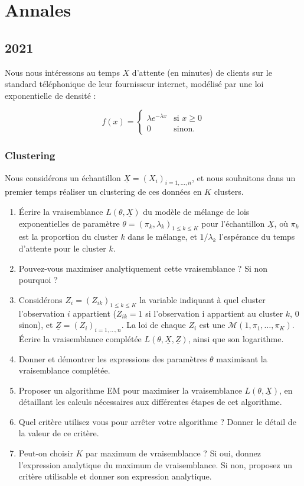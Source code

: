 \section{Annales}
\subsection{2021}
Nous nous intéressons au temps $X$ d’attente (en minutes) de clients sur le standard téléphonique de leur fournisseur internet, modélisé par une loi exponentielle de densité :

\[
f(x) = 
\begin{cases}
	\lambda e^{-\lambda x} & \text{si } x \geq 0 \\
	0             & \text{sinon.}
\end{cases}
\]

\subsubsection{Clustering}
Nous considérons un échantillon $\underline{X} = (X_i)_{i=1,\dots,n}$, et nous souhaitons dans un premier temps réaliser un clustering de ces données en $K$ clusters.

\begin{enumerate}
	\item Écrire la vraisemblance $L(\theta, \underline{X})$ du modèle de mélange de lois exponentielles de paramètre  $\theta = (\pi_k, \lambda_k)_{1 \leq k \leq K}$ pour l’échantillon $\underline{X}$, où $\pi_k$ est la proportion du cluster $k$ dans le mélange, et $1/\lambda_k$ l’espérance du temps d’attente pour le cluster $k$.
	\item Pouvez-vous maximiser analytiquement cette vraisemblance ? Si non pourquoi ?
	\item Considérons $Z_i = (Z_{ik})_{1 \leq k \leq K}$ la variable indiquant à quel cluster l’observation $i$ appartient ($Z_{ik}=1$ si l’observation i appartient au cluster $k$, 0 sinon), et $\underline{Z} = (Z_i)_{i=1,\dots,n}$. La loi de chaque $Z_i$ est une $\mathcal{M}(1, \pi_1,\dots,\pi_K)$. Écrire la vraisemblance complétée $L(\theta,\underline{X},\underline{Z})$, ainsi que son logarithme.
	\item Donner et démontrer les expressions des paramètres $\theta$ maximisant la vraisemblance complétée.
	\item Proposer un algorithme EM pour maximiser la vraisemblance $L(\theta, \underline{X})$, en détaillant les calculs nécessaires aux différentes étapes de cet algorithme.
	\item Quel critère utilisez vous pour arrêter votre algorithme ? Donner le détail de la valeur de ce critère.
	\item Peut-on choisir $K$ par maximum de vraisemblance ? Si oui, donnez l’expression analytique du maximum de vraisemblance. Si non, proposez un critère utilisable et donner son expression analytique.
\end{enumerate}

